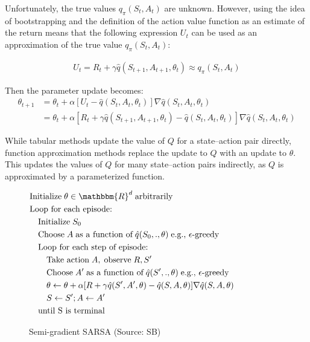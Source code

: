 Unfortunately, the true values $q_\pi(S_t, A_t)$ are unknown. However, using the idea of bootstrapping and the definition of the action value function as an estimate of the return means that the following expression $U_t$ can be used as an approximation of the true value $q_\pi(S_t, A_t)$: 

\begin{align*}
U_t = R_t + \gamma \hat{q}(S_{t+1}, A_{t+1}, \theta_t) \approx q_\pi(S_t, A_t)
\end{align*}

Then the parameter update becomes:
\begin{align}
\theta_{t+1} &= \theta_t + \alpha \left[ U_t - \hat{q}(S_t, A_t, \theta_t)\right] \nabla \hat{q}(S_t, A_t, \theta_t) \label{eq:dqnupdate} \\
 &= \theta_t + \alpha \left[ R_t + \gamma \hat{q}(S_{t+1}, A_{t+1}, \theta_t) - \hat{q}(S_t, A_t, \theta_t)\right] \nabla \hat{q}(S_t, A_t, \theta_t) \nonumber
\end{align}

\begin{alertbox}
While tabular methods update the value of $Q$ for a state--action pair directly, function approximation methods replace the update to $Q$ with an update to $\theta$. This updates the values of $Q$ for many state--action pairs indirectly, as $Q$ is approximated by a parameterized function.
\end{alertbox}

\begin{figure}
\small
\begin{pseudocodebox}
\vspace{-\baselineskip}
\begin{align*}
& \text{Initialize}\; \theta \in \mathbbm{R}^d \; \text{arbitrarily} \\
& \text{Loop for each episode:} \\
& \quad \text{Initialize}\; S_0 \\
& \quad \text{Choose}\; A \; \text{as a function of}\; \hat{q}(S_0, ., \theta) \; \text{e.g., $\epsilon$-greedy} \\ 
& \quad \text{Loop for each step of episode:} \\
& \quad \quad \text{Take action}\; A, \; \text{observe} \; R, S' \\
& \quad \quad \text{Choose}\; A' \; \text{as a function of}\; \hat{q}(S', ., \theta) \; \text{e.g., $\epsilon$-greedy} \\ 
& \quad \quad \theta \leftarrow \theta + \alpha [R + \gamma \hat{q}(S', A', \theta) - \hat{q}(S, A, \theta)] \nabla \hat{q}(S, A, \theta) \hspace{1in} \\
& \quad \quad S \leftarrow S'; A \leftarrow A'\\
& \quad \text{until S is terminal}
\end{align*}
\end{pseudocodebox}
\caption[Semi-gradient SARSA]{Semi-gradient SARSA (Source: SB)}
\label{fig:gradientsarsa}
\end{figure}

